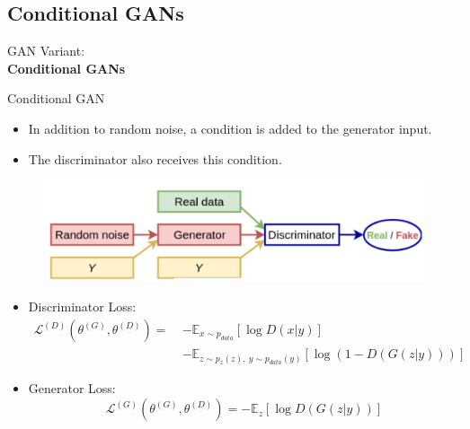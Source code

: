 \subsection{Conditional GANs}
\begin{frame}{}
    \LARGE GAN Variant: \\[1.5ex] \textbf{Conditional GANs}
\end{frame}

\begin{frame}[allowframebreaks]{Conditional GAN}
\begin{itemize}
    \item In addition to random noise, a condition is added to the generator input. 
    \item The discriminator also receives this condition.
\end{itemize}
\begin{figure}
    \centering
    \includegraphics[height=0.8\textheight, width=\textwidth, keepaspectratio]{images/gan/cond_gan_1.png}
\end{figure}

\framebreak
\begin{itemize}
    \item Discriminator Loss:
    \begin{align*}
    \mathcal{L}^{(D)} \left( \theta^{(G)}, \theta^{(D)} \right) =\ & 
    - \mathbb{E}_{x \sim p_{data}} \left[ \log D(x|y) \right] \\
    & - \mathbb{E}_{z \sim p_z(z),\ y \sim p_{data}(y)} \left[ \log(1 - D(G(z|y))) \right]
    \end{align*}
    \item Generator Loss:
    $$
    \mathcal{L}^{(G)} \left( \theta^{(G)}, \theta^{(D)} \right) = - \mathbb{E}_z \left[ \log D(G(z|y)) \right]
    $$
\end{itemize}


\end{frame}
